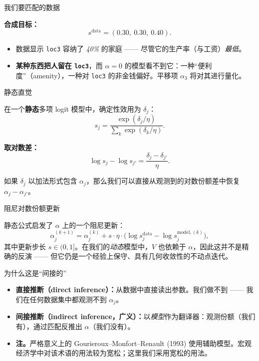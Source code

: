 \documentclass[10pt,aspectratio=169]{beamer}
\begin{document}
\begin{frame}{我们要匹配的数据}

\textbf{合成目标：}
\[
s^{\text{data}} = (0.30,\ 0.30,\ 0.40).
\]

\vspace{0.4em}

\begin{itemize}
  \item 数据显示 \texttt{loc3} 容纳了 \emph{40\%} 的家庭 —— 尽管它的生产率（与工资）\emph{最低}。
  \item \textbf{某种东西把人留在 \texttt{loc3}}，而 $\alpha = 0$ 的模型看不到它：一种``便利度''（amenity），一种对 \texttt{loc3} 的非金钱偏好。平移项 $\alpha_3$ 将对其进行量化。
\end{itemize}

\end{frame}

\begin{frame}{静态直觉}

在一个\textbf{静态}多项 logit 模型中，确定性效用为 $\delta_j$：
\[
s_j = \frac{\exp(\delta_j / \eta)}{\sum_k \exp(\delta_k / \eta)}.
\]

\textbf{取对数差：}
\[
\log s_j - \log s_{j'} = \frac{\delta_j - \delta_{j'}}{\eta}.
\]

如果 $\delta_j$ 以加法形式包含 $\alpha_j$，那么我们可以直接从观测到的对数份额差中恢复 $\alpha_j - \alpha_{j'}$。

\end{frame}

\begin{frame}{阻尼对数份额更新}

静态公式启发了 $\alpha$ 上的一个阻尼更新：
\[
\alpha_j^{(k+1)} = \alpha_j^{(k)} + s \cdot \eta \cdot \bigl( \log s_j^{\text{data}} - \log s_j^{\text{model}, (k)} \bigr),
\]
其中更新步长 $s \in (0, 1]$。在我们的\emph{动态}模型中，$V$ 也依赖于 $\alpha$，因此这并不是精确的反演 —— 但它仍是一个经验上保守、具有几何收敛性的不动点迭代。

\end{frame}

\begin{frame}{为什么这是``间接的''}

\begin{itemize}
  \item \textbf{直接推断（direct inference）：}从数据中直接读出参数。我们做不到 —— 我们在任何数据集中都观测不到 $\alpha_j$。
  \item \textbf{间接推断（indirect inference，广义）：}以\emph{模型}作为翻译器：观测份额（我们有），通过匹配反推出 $\alpha$（我们没有）。
  \item \textbf{注。}严格意义上的 Gourieroux--Monfort--Renault (1993) 使用辅助模型。宏观经济学中对该术语的用法较为宽松；这里我们采用宽松的用法。
\end{itemize}

\end{frame}
\end{document}
